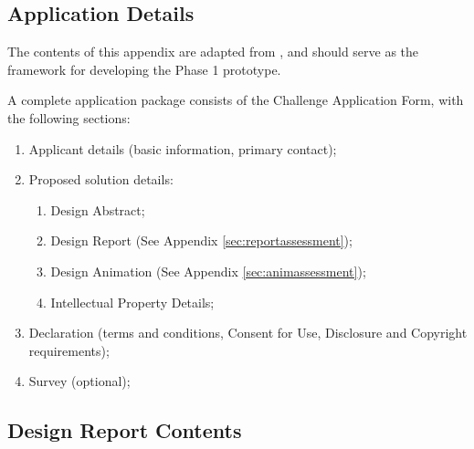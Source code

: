 \documentclass{report}
\begin{document}
\begin{appendices}
\newpage
\section{Application Details}
\label{sec:application}

The contents of this appendix are adapted from \cite{applicantguide}, and should serve as the framework for developing the Phase 1 prototype.

A complete application package consists of the Challenge Application Form, with the following sections:
\begin{enumerate}
    \item Applicant details (basic information, primary contact);
    \item Proposed solution details:
    \begin{enumerate}
        \item Design Abstract;
        \item Design Report (See Appendix \ref{sec:reportassessment});
        \item Design Animation (See Appendix \ref{sec:animassessment});
        \item Intellectual Property Details;
    \end{enumerate}
    \item Declaration (terms and conditions, Consent for Use, Disclosure and Copyright requirements);
    \item Survey (optional);
\end{enumerate}

\subsection{Design Report Contents}
\label{sec:reportcontents}


\end{appendices}
\end{document}
